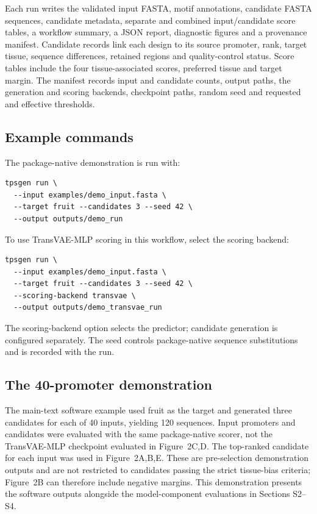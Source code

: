 \documentclass[10pt]{article}
\begin{document}
Each run writes the validated input FASTA, motif annotations, candidate FASTA sequences, candidate metadata, separate and combined input/candidate score tables, a workflow summary, a JSON report, diagnostic figures and a provenance manifest. Candidate records link each design to its source promoter, rank, target tissue, sequence differences, retained regions and quality-control status. Score tables include the four tissue-associated scores, preferred tissue and target margin. The manifest records input and candidate counts, output paths, the generation and scoring backends, checkpoint paths, random seed and requested and effective thresholds.

\subsection{Example commands}

The package-native demonstration is run with:
\begin{verbatim}
tpsgen run \
  --input examples/demo_input.fasta \
  --target fruit --candidates 3 --seed 42 \
  --output outputs/demo_run
\end{verbatim}

\noindent\begin{minipage}{\linewidth}
To use TransVAE-MLP scoring in this workflow, select the scoring backend:
\begin{verbatim}
tpsgen run \
  --input examples/demo_input.fasta \
  --target fruit --candidates 3 --seed 42 \
  --scoring-backend transvae \
  --output outputs/demo_transvae_run
\end{verbatim}
\end{minipage}

The scoring-backend option selects the predictor; candidate generation is configured separately. The seed controls package-native sequence substitutions and is recorded with the run.

\subsection{The 40-promoter demonstration}

The main-text software example used fruit as the target and generated three candidates for each of 40 inputs, yielding 120 sequences. Input promoters and candidates were evaluated with the same package-native scorer, not the TransVAE-MLP checkpoint evaluated in Figure~2C,D. The top-ranked candidate for each input was used in Figure~2A,B,E. These are pre-selection demonstration outputs and are not restricted to candidates passing the strict tissue-bias criteria; Figure~2B can therefore include negative margins. This demonstration presents the software outputs alongside the model-component evaluations in Sections S2--S4.



\end{document}
